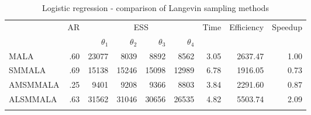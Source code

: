 \documentclass[twoside,11pt]{article}
\begin{document}
\begin{table}
	\caption{Logistic regression - comparison of Langevin sampling methods}
	\label{tab:logit}
	\begin{tabular}{l|r|rrrr|r|r|r}
		\hline\noalign{\smallskip}
		\multirow{2}{*}{Method} &
		\multirow{2}{*}{AR} &
		\multicolumn{4}{c|}{ESS} &
		\multirow{2}{*}{Time} &
		\multirow{2}{*}{Efficiency} &
		\multirow{2}{*}{Speedup} \\
		& & $\theta_1$ & $\theta_2$ & $\theta_3$ & $\theta_4$ & & & \\
		\noalign{\smallskip}\hline\noalign{\smallskip}
		MALA & .60 & 23077 & 8039 & 8892 & 8562 & 3.05 & 2637.47 & 1.00 \\
		SMMALA & .69 & 15138 & 15246 & 15098 & 12989 & 6.78 & 1916.05 & 0.73 \\
		AMSMMALA & .25 & 9401 & 9208 & 9366 & 8803 & 3.84 & 2291.60 & 0.87 \\
	  ALSMMALA & .63 & 31562 & 31046 & 30656 & 26535 & 4.82 & 5503.74 & 2.09 \\
		\noalign{\smallskip}\hline
	\end{tabular}
\end{table}
\end{document}
